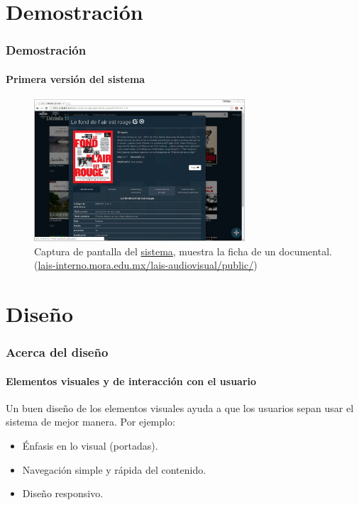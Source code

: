 \documentclass{beamer}
\begin{document}
\section{Demostración}
\begin{frame}
	\frametitle{Demostración}
	\framesubtitle{Primera versión del sistema}
	
	\begin{figure}[H]
		\centering
		\includegraphics[width=0.7\textwidth]{Sistema01.jpg}
		\caption{Captura de pantalla del \href{http://201.148.84.214/lais-audiovisual/public}{sistema}, muestra la ficha de un documental. (\url{lais-interno.mora.edu.mx/lais-audiovisual/public/})}
		\label{fig:sistema01}
	\end{figure}
\end{frame}

\section{Diseño}
\begin{frame}
	\frametitle{Acerca del diseño}
	\framesubtitle{Elementos visuales y de interacción con el usuario}
	
	Un buen diseño de los elementos visuales ayuda a que los usuarios sepan usar el sistema de mejor manera. Por ejemplo:
	
	\begin{itemize}
		\item Énfasis en lo visual (portadas).
		\item Navegación simple y rápida del contenido.
		\item Diseño responsivo.
	\end{itemize}
\end{frame}
\end{document}
